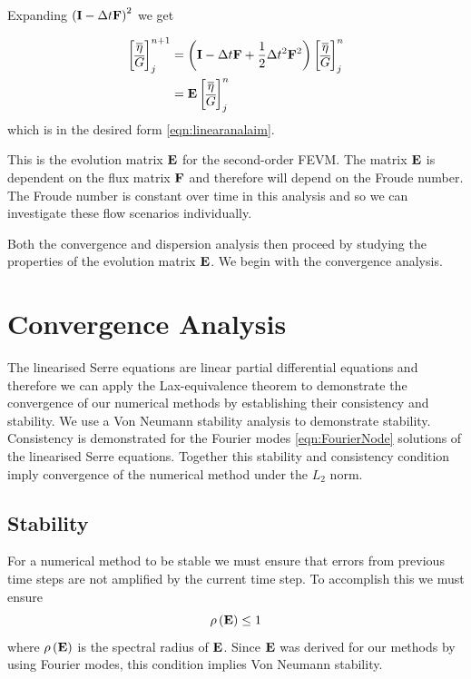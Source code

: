 Expanding $\left(\mathbf{I} - \Delta t\mathbf{F} \right)^2$ we get

\begin{align}
\begin{bmatrix}
\overline{\eta} \\ \overline{G}
\end{bmatrix}^{n+1}_j &= \left(\mathbf{I}  -\Delta t\mathbf{F} + \frac{1}{2}\Delta t^2\mathbf{F}^2 \right) \begin{bmatrix}
\overline{\eta} \\ \overline{G}
\end{bmatrix}^{n}_j \nonumber\\ &=  \mathbf{E}\begin{bmatrix}
\overline{\eta} \\ \overline{G}
\end{bmatrix}^{n}_j
\label{eqn:evolutionmatrix}
\end{align}
which is in the desired form \eqref{eqn:linearanalaim}.

This is the evolution matrix $\mathbf{E}$ for the second-order FEVM. The matrix $\mathbf{E}$ is dependent on the flux matrix $\mathbf{F}$ and therefore will depend on the Froude number. The Froude number is constant over time in this analysis and so we can investigate these flow scenarios individually.

Both the convergence and dispersion analysis then proceed by studying the properties of the evolution matrix $\mathbf{E}$. We begin with the convergence analysis.

\setcounter{subsection}{0}
\renewcommand{\thesubsection}{\thechapter.\arabic{section}.\arabic{subsection}} 

\section{Convergence Analysis}
The linearised Serre equations are linear partial differential equations and therefore we can apply the Lax-equivalence theorem to demonstrate the convergence of our numerical methods by establishing their consistency and stability. We use a Von Neumann stability analysis to demonstrate stability. Consistency is demonstrated for the Fourier modes \eqref{eqn:FourierNode} solutions of the linearised Serre equations. Together this stability and consistency condition imply convergence of the numerical method under the $L_2$ norm.

\subsection{Stability}
For a numerical method to be stable we must ensure that errors from previous time steps are not amplified by the current time step. To accomplish this we must ensure 
\begin{equation}
\rho\left(\mathbf{E} \right) \le 1
\label{eqn:stabilitycondition}
\end{equation}
where $\rho\left(\mathbf{E} \right)$ is the spectral radius of $\mathbf{E}$. Since $\mathbf{E}$ was derived for our methods by using Fourier modes, this condition implies Von Neumann stability. 

